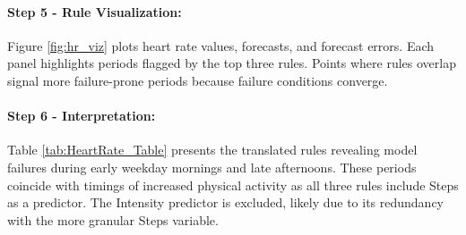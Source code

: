 \documentclass[]{interact}
\theoremstyle{definition}
\begin{document}
\paragraph*{Step 5 - Rule Visualization:}
Figure \ref{fig:hr_viz} plots heart rate values, forecasts, and forecast errors. Each panel highlights periods flagged by the top three rules. Points where rules overlap signal more failure-prone periods because failure conditions converge.

\paragraph*{Step 6 - Interpretation:}
Table \ref{tab:HeartRate_Table} presents the translated rules revealing model failures during early weekday mornings and late afternoons. These  periods coincide with timings of increased physical activity as all three rules include Steps as a predictor. The Intensity predictor is excluded, likely due to its redundancy with the more granular Steps variable.
\end{document}
